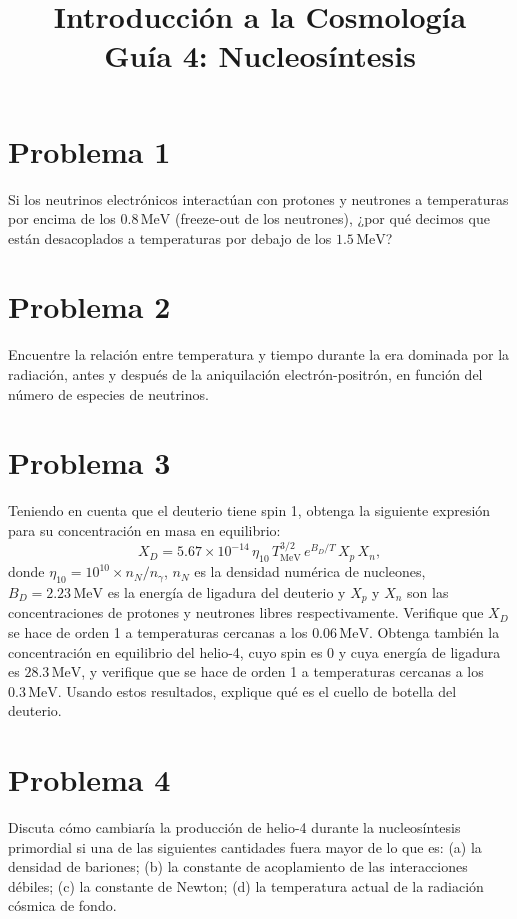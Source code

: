 \documentclass[11pt,a4paper]{article}
\title{\textbf{Introducción a la Cosmología \\ Guía 4: Nucleosíntesis}}
\date{}
\begin{document}
\maketitle

\section*{Problema 1}
Si los neutrinos electrónicos interactúan con protones y neutrones a temperaturas por encima de los $0.8\,\text{MeV}$ (freeze-out de los neutrones), ¿por qué decimos que están desacoplados a temperaturas por debajo de los $1.5\,\text{MeV}$?

\section*{Problema 2}
Encuentre la relación entre temperatura y tiempo durante la era dominada por la radiación, antes y después de la aniquilación electrón-positrón, en función del número de especies de neutrinos.

\section*{Problema 3}
Teniendo en cuenta que el deuterio tiene spin 1, obtenga la siguiente expresión para su concentración en masa en equilibrio:
\begin{equation}
  X_D=5.67\times10^{-14}\,\eta_{10}\,T_{\text{MeV}}^{3/2}\,e^{B_D/T}\,X_p\,X_n,
\end{equation}
donde $\eta_{10}=10^{10}\times n_N/n_\gamma$, $n_N$ es la densidad numérica de nucleones, $B_D=2.23\,\text{MeV}$ es la energía de ligadura del deuterio y $X_p$ y $X_n$ son las concentraciones de protones y neutrones libres respectivamente. Verifique que $X_D$ se hace de orden 1 a temperaturas cercanas a los $0.06\,\text{MeV}$. Obtenga también la concentración en equilibrio del helio-4, cuyo spin es 0 y cuya energía de ligadura es $28.3\,\text{MeV}$, y verifique que se hace de orden 1 a temperaturas cercanas a los $0.3\,\text{MeV}$. Usando estos resultados, explique qué es el cuello de botella del deuterio.

\section*{Problema 4}
Discuta cómo cambiaría la producción de helio-4 durante la nucleosíntesis primordial si una de las siguientes cantidades fuera mayor de lo que es: (a) la densidad de bariones; (b) la constante de acoplamiento de las interacciones débiles; (c) la constante de Newton; (d) la temperatura actual de la radiación cósmica de fondo.
\end{document}
